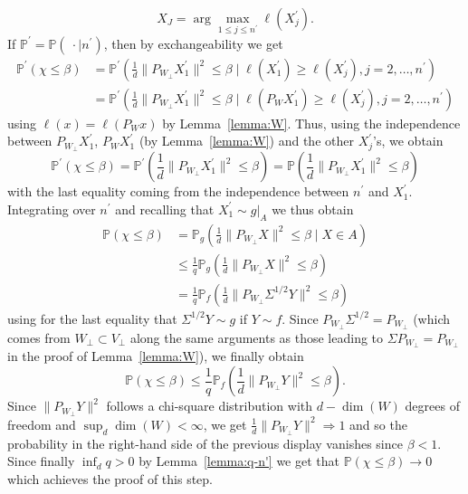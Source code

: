 \documentclass[]{article}
\renewcommand{\P}{\mathbb{P}}
\theoremstyle{plain}
\theoremstyle{definition}
\begin{document}
\[ X_J = \arg \max_{1 \leq j \leq n^\prime} \ell(X^\prime_j). \]
If $\P^\prime = \P(\ \cdot \mid n^\prime)$, then by exchangeability we get
\begin{align*}
	\P^\prime \left( \chi \leq \beta \right) & = \P^\prime \left( \frac{1}{d} \lVert P_{W_\perp} X^\prime_1 \rVert^2 \leq \beta \mid \ell(X^\prime_1) \geq \ell(X^\prime_j), j = 2, \ldots, n^\prime \right)\\
	& = \P^\prime \left( \frac{1}{d} \lVert P_{W_\perp} X^\prime_1 \rVert^2 \leq \beta \mid \ell(P_W  X^\prime_1) \geq \ell(X^\prime_j), j = 2, \ldots, n^\prime \right)
\end{align*}
using $\ell(x) = \ell(P_W x)$ by Lemma~\ref{lemma:W}. Thus, using the independence between $P_{W_\perp} X^\prime_1$, $P_W X^\prime_1$ (by Lemma~\ref{lemma:W}) and the other $X^\prime_j$'s, we obtain
\[ \P^\prime \left( \chi \leq \beta \right) = \P^\prime \left( \frac{1}{d} \lVert P_{W_\perp} X^\prime_1 \rVert^2 \leq \beta \right) = \P \left( \frac{1}{d} \lVert P_{W_\perp} X^\prime_1 \rVert^2 \leq \beta \right) \]
with the last equality coming from the independence between $n^\prime$ and $X^\prime_1$. Integrating over $n^\prime$ and recalling that $X^\prime_1 \sim g|_A$ we thus obtain
\begin{align*}
	\P \left( \chi \leq \beta \right) & = \P_g \left( \frac{1}{d} \lVert P_{W_\perp} X \rVert^2 \leq \beta \mid X \in A \right)\\
	& \leq \frac{1}{q} \P_g \left( \frac{1}{d} \lVert P_{W_\perp} X \rVert^2 \leq \beta \right)\\
	& = \frac{1}{q} \P_f \left( \frac{1}{d} \lVert P_{W_\perp} \Sigma^{1/2} Y \rVert^2 \leq \beta \right)
\end{align*}
using for the last equality that $\Sigma^{1/2} Y \sim g$ if $Y \sim f$. Since $P_{W_\perp} \Sigma^{1/2} = P_{W_\perp}$ (which comes from $W_\perp \subset V_\perp$ along the same arguments as those leading to $\Sigma P_{W_\perp} = P_{W_\perp}$ in the proof of Lemma~\ref{lemma:W}), we finally obtain
\[ \P \left( \chi \leq \beta \right) \leq \frac{1}{q} \P_f \left( \frac{1}{d} \lVert P_{W_\perp} Y \rVert^2 \leq \beta \right). \]
Since $\lVert P_{W_\perp} Y \rVert^2$ follows a chi-square distribution with $d - \dim(W)$ degrees of freedom and $\sup_d \dim(W)< \infty$, we get $\frac{1}{d} \lVert P_{W_\perp} Y \rVert^2 \Rightarrow 1$ and so the probability in the right-hand side of the previous display vanishes since $\beta < 1$. Since finally $\inf_d q > 0$ by Lemma~\ref{lemma:q-n'} we get that $\P(\chi \leq \beta) \to 0$ which achieves the proof of this step.
\end{document}
